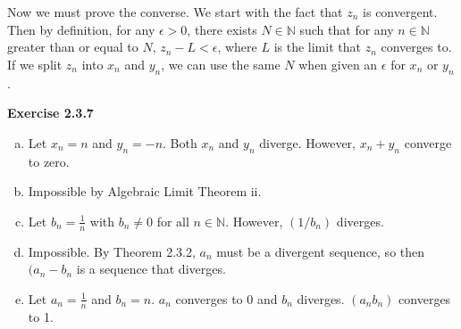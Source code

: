 \documentclass{article}
\begin{document}
Now we must prove the converse. We start with the fact that \(z_{n}\) is convergent.
Then by definition, for any \(\epsilon > 0\), there exists \(N \in \mathbb{N}\) such
that for any \(n \in \mathbb{N}\) greater than or equal to \(N\),
\(z_{n} - L < \epsilon\), where \(L\) is the limit that \(z_{n}\) converges to. If
we split \(z_{n}\) into \(x_{n}\) and \(y_{n}\), we can use the same \(N\) when
given an \(\epsilon\) for \(x_{n}\) or \(y_{n}\). 


\textbf{Exercise 2.3.7}
\begin{enumerate}[(a)]
\item Let \(x_{n} = n\) and \(y_{n} = -n\). Both \(x_{n}\) and \(y_{n}\) diverge. However,
  \(x_{n} + y_{n}\) converge to zero.

\item Impossible by Algebraic Limit Theorem ii.
  
\item Let \(b_{n} = \frac{1}{n}\) with \(b_{n} \neq 0\) for all \(n \in \mathbb{N}\). However,
  \((1 / b_{n})\) diverges.
  
\item Impossible. By Theorem 2.3.2, \(a_{n}\) must be a divergent sequence, so then \((a_{n} - b_{n}\)
  is a sequence that diverges.
  
\item Let \(a_{n} = \frac{1}{n}\) and \(b_{n} = n\). \(a_{n}\) converges to 0 and \(b_{n}\)
  diverges. \((a_{n} b_{n})\) converges to 1.

\end{enumerate}
\end{document}
